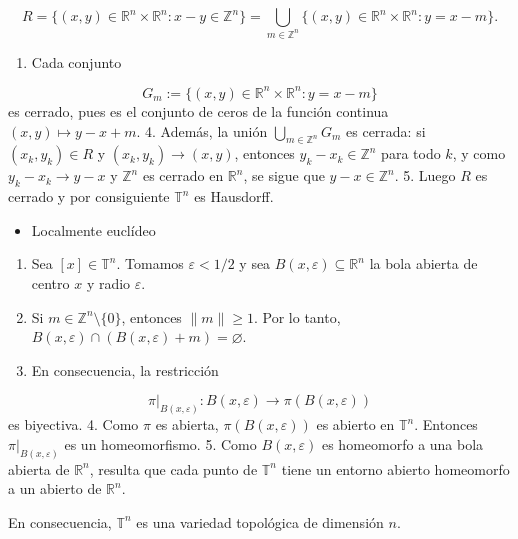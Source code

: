 \begin{bookproof}{}
\[
R=\{(x,y)\in \mathbb{R}^n\times \mathbb{R}^n:x-y\in \mathbb{Z}^n\}
=\bigcup_{m\in \mathbb{Z}^n}\{(x,y)\in \mathbb{R}^n\times \mathbb{R}^n:y=x-m\}.
\]
\begin{enumerate}[start=3]
\item Cada conjunto
\end{enumerate}
\[
G_m:=\{(x,y)\in \mathbb{R}^n\times \mathbb{R}^n:y=x-m\}
\]
es cerrado, pues es el conjunto de ceros de la función continua $(x,y)\mapsto y-x+m$. 4. Además, la unión $\bigcup_{m\in \mathbb{Z}^n}G_m$ es cerrada: si $(x_k,y_k)\in R$ y $(x_k,y_k)\to (x,y)$, entonces $y_k-x_k\in \mathbb{Z}^n$ para todo $k$, y como $y_k-x_k\to y-x$ y $\mathbb{Z}^n$ es cerrado en $\mathbb{R}^n$, se sigue que $y-x\in \mathbb{Z}^n$. 5. Luego $R$ es cerrado y por consiguiente $\mathbb{T}^n$ es Hausdorff.

\begin{itemize}
\item Localmente euclídeo
\end{itemize}
\begin{enumerate}
\item Sea $[x]\in \mathbb{T}^n$. Tomamos $\varepsilon<1/2$ y sea $B(x,\varepsilon)\subseteq \mathbb{R}^n$ la bola abierta de centro $x$ y radio $\varepsilon$.
\item Si $m\in \mathbb{Z}^n\setminus\{0\}$, entonces $\|m\|\ge 1$. Por lo tanto, $B(x,\varepsilon)\cap (B(x,\varepsilon)+m)=\varnothing$.
\item En consecuencia, la restricción
\end{enumerate}
\[
\pi|_{B(x,\varepsilon)}:B(x,\varepsilon)\longrightarrow \pi(B(x,\varepsilon))
\]
es biyectiva. 4. Como $\pi$ es abierta, $\pi(B(x,\varepsilon))$ es abierto en $\mathbb{T}^n$. Entonces $\pi|_{B(x,\varepsilon)}$ es un homeomorfismo. 5. Como $B(x,\varepsilon)$ es homeomorfo a una bola abierta de $\mathbb{R}^n$, resulta que cada punto de $\mathbb{T}^n$ tiene un entorno abierto homeomorfo a un abierto de $\mathbb{R}^n$.

En consecuencia, $\mathbb{T}^n$ es una variedad topológica de dimensión $n$.

\bookqed
\end{bookproof}

